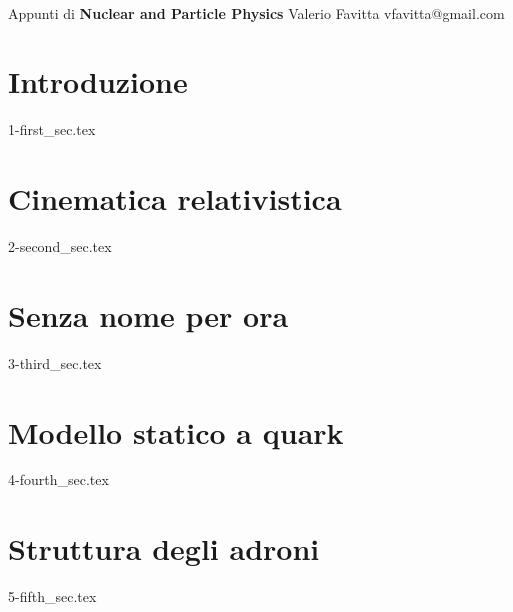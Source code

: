 \documentclass[11pt]{article}
\begin{document}
\newcommand*\subtxt[1]{_{\textnormal{#1}}}
\DeclareRobustCommand\_{\ifmmode\expandafter\subtxt\else\textunderscore\fi}

\thispagestyle{empty}
\bigskip \
\vspace{0.1cm}

\begin{center}
{\fontsize{22}{22} \selectfont Appunti di}
\vskip 16pt
{\fontsize{36}{36} \selectfont \bf \sffamily Nuclear and Particle Physics}
\vskip 24pt
{\fontsize{18}{18} \selectfont \rmfamily Valerio Favitta} 
\vskip 6pt
{\fontsize{14}{14} \selectfont \ttfamily vfavitta@gmail.com} 
\vskip 24pt
\end{center}

{\parindent0pt \baselineskip=15.5pt \lipsum[1-4]}

\newpage
\microtoc
\newpage

\section{Introduzione}\label{sec:intro}
{1-first_sec.tex}

\section{Cinematica relativistica}
{2-second_sec.tex}

\section{Senza nome per ora}
{3-third_sec.tex}


\section{Modello statico a quark}
{4-fourth_sec.tex}

\section{Struttura degli adroni}
{5-fifth_sec.tex}
\end{document}
